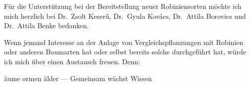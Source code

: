 \documentclass[twocolumn]{scrartcl}
\begin{document}
Für die Unterstützung bei der Bereitstellung neuer Robiniensorten
möchte ich mich herzlich bei Dr.~Zsolt Keserű, Dr.~Gyula Kovács,
Dr.~Attila Borovics und Dr.~Attila Benke bedanken.

Wenn jemand Interesse an der Anlage von Vergleichspflanzungen mit
Robinien oder anderen Baumarten hat oder selbst bereits solche
durchgeführt hat, würde ich mich über einen Austausch freuen.
Denn:
\begin{center}
äume ormen älder --- Gemeinsam wächst Wissen
\end{center}


%
\printbibliography[title={Literatur / Literature}]

\end{document}
